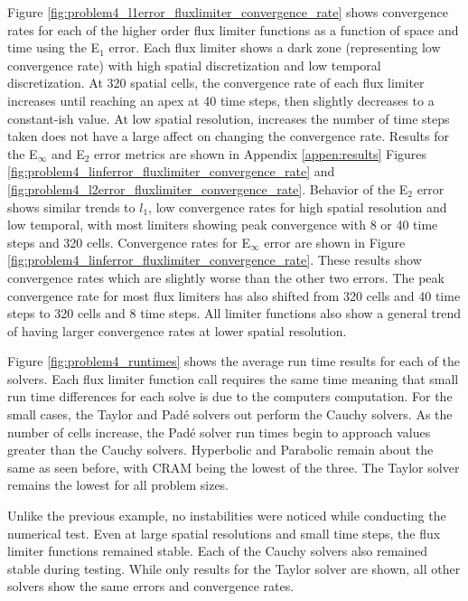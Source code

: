 Figure \ref{fig:problem4_l1error_fluxlimiter_convergence_rate} shows convergence rates for each of the higher order flux limiter functions as a function of space and time using the E${}_{1}$ error. Each flux limiter shows a dark zone (representing low convergence rate) with high spatial discretization and low temporal discretization. At 320 spatial cells, the convergence rate of each flux limiter increases until reaching an apex at 40 time steps, then slightly decreases to a constant-ish value. At low spatial resolution, increases the number of time steps taken does not have a large affect on changing the convergence rate. Results for the E${}_{\infty}$ and E${}_{2}$ error metrics are shown in Appendix \ref{appen:results} Figures \ref{fig:problem4_linferror_fluxlimiter_convergence_rate} and \ref{fig:problem4_l2error_fluxlimiter_convergence_rate}. Behavior of the E${}_{2}$ error shows similar trends to $l_{1}$, low convergence rates for high spatial resolution and low temporal, with most limiters showing peak convergence with 8 or 40 time steps and 320 cells. Convergence rates for E${}_{\infty}$ error are shown in Figure \ref{fig:problem4_linferror_fluxlimiter_convergence_rate}. These results show convergence rates which are slightly worse than the other two errors. The peak convergence rate for most flux limiters has also shifted from 320 cells and 40 time steps to 320 cells and 8 time steps. All limiter functions also show a general trend of having larger convergence rates at lower spatial resolution. 

Figure \ref{fig:problem4_runtimes} shows the average run time results for each of the solvers. Each flux limiter function call requires the same time meaning that small run time differences for each solve is due to the computers computation. For the small cases, the Taylor and Pad\'e solvers out perform the Cauchy solvers. As the number of cells increase, the Pad\'e solver run times begin to approach values greater than the Cauchy solvers. Hyperbolic and Parabolic remain about the same as seen before, with CRAM being the lowest of the three. The Taylor solver remains the lowest for all problem sizes. 

Unlike the previous example, no instabilities were noticed while conducting the numerical test. Even at large spatial resolutions and small time steps, the flux limiter functions remained stable. Each of the Cauchy solvers also remained stable during testing. While only results for the Taylor solver are shown, all other solvers show the same errors and convergence rates.

